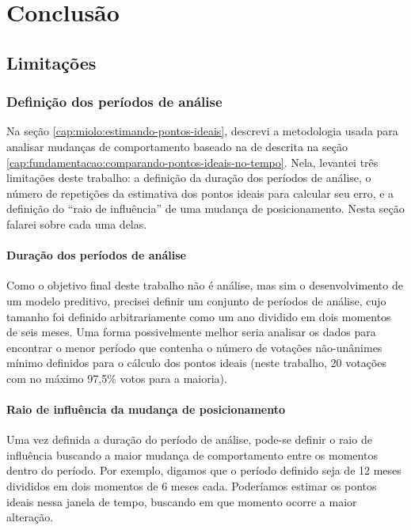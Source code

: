 \chapter{Conclusão}\label{cap:conclusao}

\section{Limitações}
\label{cap:conclusao:limitacoes}

\subsection{Definição dos períodos de análise}

Na seção \ref{cap:miolo:estimando-pontos-ideais}, descrevi a metodologia usada
para analisar mudanças de comportamento baseado na de 
descrita na seção \ref{cap:fundamentacao:comparando-pontos-ideais-no-tempo}.
Nela, levantei três limitações deste trabalho: a definição da duração dos
períodos de análise, o número de repetições da estimativa dos pontos ideais para
calcular seu erro, e a definição do ``raio de influência'' de uma mudança de
posicionamento. Nesta seção falarei sobre cada uma delas.

\subsubsection*{Duração dos períodos de análise}

Como o objetivo final deste trabalho não é análise, mas sim o desenvolvimento
de um modelo preditivo, precisei definir um conjunto de períodos de análise,
cujo tamanho foi definido arbitrariamente como um ano dividido em dois momentos
de seis meses. Uma forma possivelmente melhor seria analisar os dados para
encontrar o menor período que contenha o número de votações não-unânimes mínimo
definidos para o cálculo dos pontos ideais (neste trabalho, 20 votações com no
máximo 97,5\% votos para a maioria).

\subsubsection*{Raio de influência da mudança de posicionamento}

Uma vez definida a duração do período de análise, pode-se definir o raio de
influência buscando a maior mudança de comportamento entre os momentos dentro
do período. Por exemplo, digamos que o período definido seja de 12 meses
divididos em dois momentos de 6 meses cada. Poderíamos estimar os pontos ideais
nessa janela de tempo, buscando em que momento ocorre a maior alteração.
